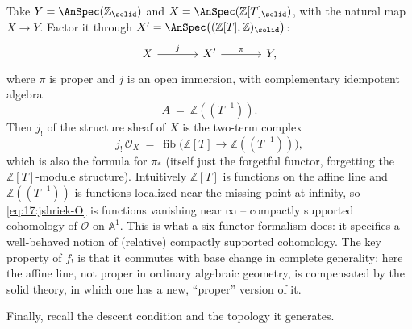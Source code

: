 \begin{example}
\label{ex:17:affine-line}
Take $Y=\AnSpec(\mathbb{Z}_{\solid})$ and $X=\AnSpec(\mathbb{Z}[T]_{\solid})$, with the
natural map $X\to Y$. Factor it through $X'=\AnSpec\bigl((\mathbb{Z}[T],\mathbb{Z})_{\solid}\bigr)$:
\[
\begin{tikzcd}[column sep=large]
X \arrow[r, "j"] & X' \arrow[r, "\pi"] & Y,
\end{tikzcd}
\]
where $\pi$ is proper and $j$ is an open immersion, with complementary idempotent
algebra
\begin{equation*}
A\ =\ \mathbb{Z}(\!(T^{-1})\!).
\end{equation*}
Then $j_{!}$ of the structure sheaf of $X$ is the two-term complex
\begin{equation}
\label{eq:17:jshriek-O}
j_{!}\,\mathcal O_{X}\ =\ \operatorname{fib}\bigl(\mathbb{Z}[T]\to\mathbb{Z}(\!(T^{-1})\!)\bigr),
\end{equation}
which is also the formula for $\pi_{*}$ (itself just the forgetful functor, forgetting the
$\mathbb{Z}[T]$-module structure). Intuitively $\mathbb{Z}[T]$ is functions on the affine
line and $\mathbb{Z}(\!(T^{-1})\!)$ is functions localized near the missing point at
infinity, so \eqref{eq:17:jshriek-O} is functions vanishing near $\infty$ -- compactly
supported cohomology of $\mathcal O$ on $\mathbb{A}^{1}$. This is what a six-functor
formalism does: it specifies a well-behaved notion of (relative) compactly supported
cohomology. The key property of $f_{!}$ is that it commutes with base change in complete
generality; here the affine line, not proper in ordinary algebraic geometry, is
compensated by the solid theory, in which one has a new, ``proper'' version of it.
\end{example}

Finally, recall the descent condition and the topology it generates.

